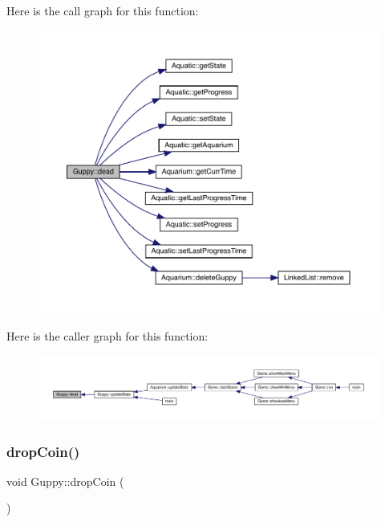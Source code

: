 Here is the call graph for this function\+:\nopagebreak
\begin{figure}[H]
\begin{center}
\leavevmode
\includegraphics[width=350pt]{class_guppy_abcdcd74d4c3fdddfc5cc0439c0e512b7_cgraph}
\end{center}
\end{figure}
Here is the caller graph for this function\+:
\nopagebreak
\begin{figure}[H]
\begin{center}
\leavevmode
\includegraphics[width=350pt]{class_guppy_abcdcd74d4c3fdddfc5cc0439c0e512b7_icgraph}
\end{center}
\end{figure}
\mbox{\label{class_guppy_a356d1f45f52684bba3e6e9e7774e59b8}} 
\subsubsection{\texorpdfstring{drop\+Coin()}{dropCoin()}}
{\footnotesize\ttfamily void Guppy\+::drop\+Coin (\begin{DoxyParamCaption}{ }\end{DoxyParamCaption})\hspace{0.3cm}{\ttfamily [virtual]}}



